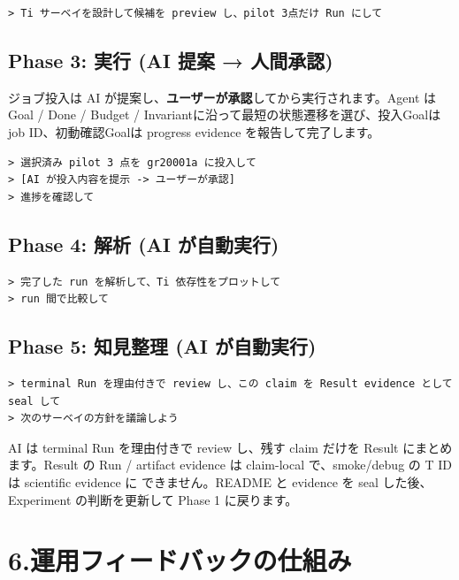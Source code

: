 \documentclass[a4paper,11pt]{article}
\begin{document}
\begin{lstlisting}[language={},commentstyle={}]
> Ti サーベイを設計して候補を preview し、pilot 3点だけ Run にして
\end{lstlisting}

\subsection*{\color{accent} Phase 3: 実行 (AI 提案 → 人間承認)}

ジョブ投入は AI が提案し、\textbf{ユーザーが承認}してから実行されます。Agent は
Goal / Done / Budget / Invariantに沿って最短の状態遷移を選び、投入Goalはjob ID、初動確認Goalは
progress evidence を報告して完了します。

\begin{lstlisting}[language={},commentstyle={}]
> 選択済み pilot 3 点を gr20001a に投入して
> [AI が投入内容を提示 -> ユーザーが承認]
> 進捗を確認して
\end{lstlisting}

\subsection*{\color{accent} Phase 4: 解析 (AI が自動実行)}

\begin{lstlisting}[language={},commentstyle={}]
> 完了した run を解析して、Ti 依存性をプロットして
> run 間で比較して
\end{lstlisting}

\subsection*{\color{accent} Phase 5: 知見整理 (AI が自動実行)}

\begin{lstlisting}[language={},commentstyle={}]
> terminal Run を理由付きで review し、この claim を Result evidence として seal して
> 次のサーベイの方針を議論しよう
\end{lstlisting}

AI は terminal Run を理由付きで review し、残す claim だけを Result にまとめます。Result の
Run / artifact evidence は claim-local で、smoke/debug の T ID は scientific evidence に
できません。README と evidence を seal した後、Experiment の判断を更新して Phase 1 に戻ります。

\section*{\color{darkblue} 6.\quad 運用フィードバックの仕組み}
\end{document}
